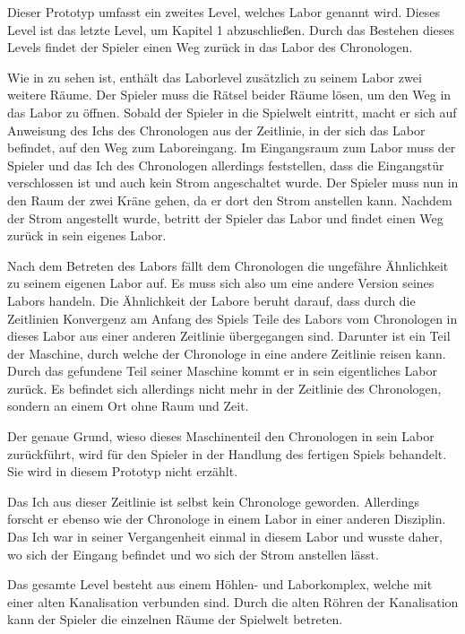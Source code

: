 Dieser Prototyp umfasst ein zweites Level, welches Labor genannt wird. Dieses Level ist das letzte Level, um Kapitel 1 abzuschließen. Durch das Bestehen dieses Levels findet der Spieler einen Weg zurück in das Labor des Chronologen.

Wie in  zu sehen ist, enthält das Laborlevel zusätzlich zu seinem Labor zwei weitere Räume. Der Spieler muss die Rätsel beider Räume lösen, um den Weg in das Labor zu öffnen. Sobald der Spieler in die Spielwelt eintritt, macht er sich auf Anweisung des Ichs des Chronologen aus der Zeitlinie, in der sich das Labor befindet, auf den Weg zum Laboreingang. Im Eingangsraum zum Labor muss der Spieler und das Ich des Chronologen allerdings feststellen, dass die Eingangstür verschlossen ist und auch kein Strom angeschaltet wurde. Der Spieler muss nun in den Raum der zwei Kräne gehen, da er dort den Strom anstellen kann. Nachdem der Strom angestellt wurde, betritt der Spieler das Labor und findet einen Weg zurück in sein eigenes Labor.

Nach dem Betreten des Labors fällt dem Chronologen die ungefähre Ähnlichkeit zu seinem eigenen Labor auf. Es muss sich also um eine andere Version seines Labors handeln. Die Ähnlichkeit der Labore beruht darauf, dass durch die Zeitlinien Konvergenz am Anfang des Spiels Teile des Labors vom Chronologen in dieses Labor aus einer anderen Zeitlinie übergegangen sind. Darunter ist ein Teil der Maschine, durch welche der Chronologe in eine andere Zeitlinie reisen kann. Durch das gefundene Teil seiner Maschine kommt er in  sein eigentliches Labor zurück. Es befindet sich allerdings nicht mehr in der Zeitlinie des Chronologen, sondern an einem Ort ohne Raum und Zeit.

Der genaue Grund, wieso dieses Maschinenteil den Chronologen in sein Labor zurückführt, wird für den Spieler in der Handlung des fertigen Spiels behandelt. Sie wird in diesem Prototyp nicht erzählt.

Das Ich aus dieser Zeitlinie ist selbst kein Chronologe geworden. Allerdings forscht er ebenso wie der Chronologe in einem Labor in einer anderen Disziplin. Das Ich war in seiner Vergangenheit einmal in diesem Labor und wusste daher, wo sich der Eingang befindet und wo sich der Strom anstellen lässt.

Das gesamte Level besteht aus einem Höhlen- und Laborkomplex, welche mit einer alten Kanalisation verbunden sind. Durch die alten Röhren der Kanalisation kann der Spieler die einzelnen Räume der Spielwelt betreten.

